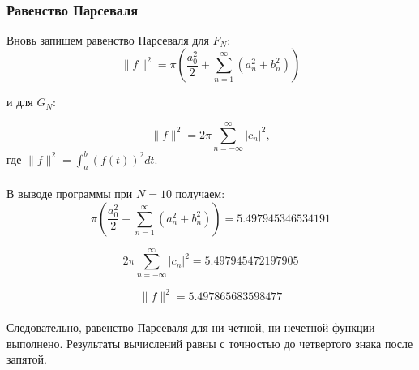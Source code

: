 \documentclass[a5paper, 10pt]{article}
\theoremstyle{definition}
\theoremstyle{plain}
\theoremstyle{remark}
\begin{document}
\newpage
\,
\newpage
\,

\subsubsection{Равенство Парсеваля}

Вновь запишем равенство Парсеваля для $F_N$:
\begin{equation}
\| f \|^2 = \pi \left( \frac{a_0^2}{2} + \sum \limits_{n=1}^{\infty} \left( a_n^2 + b_n^2 \right) \right)
\end{equation}

и для $G_N$:

\begin{equation}
\| f \|^2 = 2 \pi \sum \limits_{n = -\infty}^{\infty} |c_n |^2,
\end{equation}
где $\| f \|^2 = \int_a^b (f(t))^2 dt $.
\\
\\
 В выводе программы при $N=10$ получаем:
\begin{equation*}
 \pi \left( \frac{a_0^2}{2} + \sum \limits_{n=1}^{\infty} \left( a_n^2 + b_n^2 \right) \right) = 5.497945346534191
\end{equation*}

\begin{equation*}
2 \pi \sum \limits_{n = -\infty}^{\infty} |c_n |^2 = 5.497945472197905
\end{equation*}

\begin{equation*}
\| f \|^2  = 5.497865683598477
\end{equation*}
\\
Следовательно, равенство Парсеваля для ни четной, ни нечетной функции выполнено. Результаты вычислений равны с точностью до четвертого знака после запятой.





 
\end{document}
